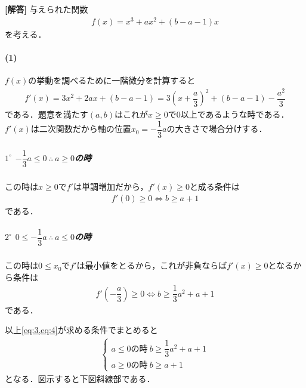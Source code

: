 \documentclass[../../main.tex]{subfiles}
\begin{document}
\begin{oframed}
  
\end{oframed}

{\bf [解答]}
与えられた関数
\begin{align}
  f(x)=x^3+ax^2+(b-a-1)x \label{eq:1}
\end{align}
を考える．

\paragraph{(1)}
$f(x)$の挙動を調べるために一階微分を計算すると
\begin{align}
  f'(x)=3x^2+2ax+(b-a-1) = 3\left(x+\dfrac{a}{3}\right)^2 + (b-a-1) -\dfrac{a^2}{3} \label{eq:2}
\end{align}
である．題意を満たす$(a,b)$はこれが$x\ge0$で0以上であるような時である．
$f'(x)$は二次関数だから軸の位置$x_0=-\dfrac{1}{3}a$の大きさで場合分けする．

\subparagraph{$1^\circ$ $-\dfrac{1}{3}a\le0\ \therefore\ a\ge0$の時}

この時は$x \ge 0$で$f'$は単調増加だから，$f'(x) \ge 0$と成る条件は
\begin{align}
  f'(0)\ge0\iff b\ge a+1 \label{eq:3}
\end{align}
である．

\subparagraph{$2^\circ$ $0\le-\dfrac{1}{3}a\ \therefore\ a\le0$の時}

この時は$0 \le x_0$で$f'$は最小値をとるから，これが非負ならば$f'(x) \ge 0$となるから条件は
\begin{align}
  f'\left(-\dfrac{a}{3}\right) \ge 0\iff b\ge\dfrac{1}{3}a^2+a+1 \label{eq:4}
\end{align}
である．
\casesend

以上\cref{eq:3,eq:4}が求める条件でまとめると
\begin{align}
  \begin{cases}\displaystyle
    a\le0\text{の時}\ b\ge\dfrac{1}{3}a^2+a+1 \\
    a\ge0\text{の時}\ b\ge a+1
  \end{cases} \label{eq:5}
\end{align}
となる．図示すると下図斜線部である．
\end{document}

